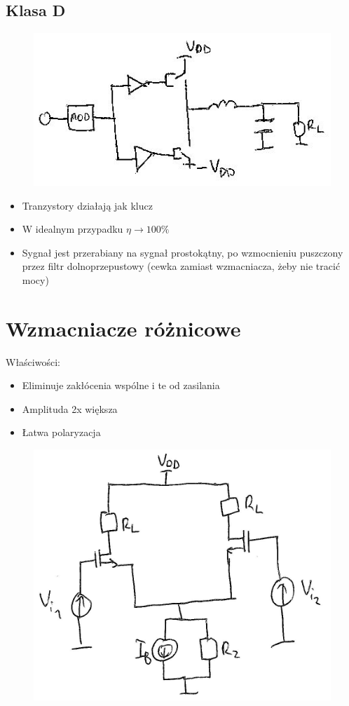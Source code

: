 \documentclass[10pt,a4paper]{article}
\begin{document}
\subsection{Klasa D}
\begin{figure}[H]
\centering
\includegraphics[scale=1]{wzm_moc_d}
\end{figure}
\begin{itemize}
\item{Tranzystory działają jak klucz}
\item{W idealnym przypadku $\eta \rightarrow 100\%$}
\item{Sygnał jest przerabiany na sygnał prostokątny, po wzmocnieniu puszczony przez filtr dolnoprzepustowy (cewka zamiast wzmacniacza, żeby nie tracić mocy)}
\end{itemize}

\section{Wzmacniacze różnicowe}
Właściwości:
\begin{itemize}
\item{Eliminuje zakłócenia wspólne i te od zasilania}
\item{Amplituda 2x większa}
\item{Łatwa polaryzacja}
\end{itemize}
\begin{figure}[H]
\centering
\includegraphics[scale=1]{roznicowy}
\end{figure}
\end{document}
